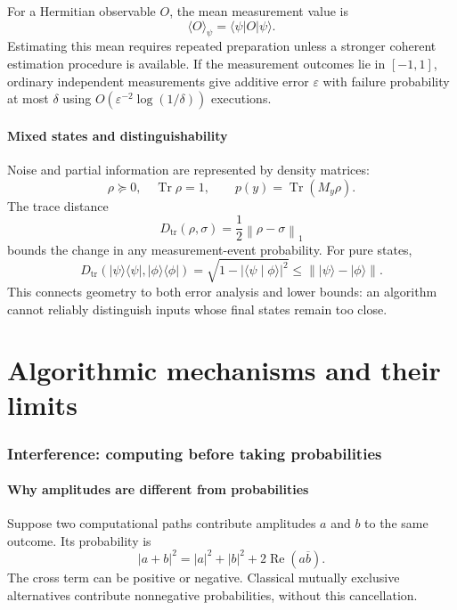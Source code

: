 \documentclass[11pt,a4paper]{article}
\newcommand{\ket}[1]{\lvert #1\rangle}
\newcommand{\bra}[1]{\langle #1\rvert}
\newcommand{\braket}[2]{\langle #1\mid #2\rangle}
\newcommand{\norm}[1]{\left\lVert #1\right\rVert}
\newcommand{\Tr}{\operatorname{Tr}}
\theoremstyle{definition}
\theoremstyle{remark}
\numberwithin{equation}{section}
\begin{document}
For a Hermitian observable $O$, the mean measurement value is
\begin{equation}
 \langle O\rangle_\psi=\bra{\psi}O\ket{\psi}.
\end{equation}
Estimating this mean requires repeated preparation unless a stronger coherent
estimation procedure is available. If the measurement outcomes lie in
$[-1,1]$, ordinary independent measurements give additive error $\varepsilon$
with failure probability at most $\delta$ using
$O(\varepsilon^{-2}\log(1/\delta))$ executions.

\subsection{Mixed states and distinguishability}
Noise and partial information are represented by density matrices:
\begin{equation}
 \rho\succeq0,\quad \Tr\rho=1,\qquad p(y)=\Tr(M_y\rho).
\end{equation}
The trace distance
\begin{equation}
 D_{\mathrm{tr}}(\rho,\sigma)=\frac12\norm{\rho-\sigma}_1
\end{equation}
bounds the change in any measurement-event probability. For pure states,
\begin{equation}\label{eq:tracedistance}
 D_{\mathrm{tr}}(\ket{\psi}\bra{\psi},\ket{\phi}\bra{\phi})
 =\sqrt{1-|\braket{\psi}{\phi}|^2}
 \leq\norm{\ket{\psi}-\ket{\phi}}.
\end{equation}
This connects geometry to both error analysis and lower bounds: an algorithm
cannot reliably distinguish inputs whose final states remain too close.



\FloatBarrier\clearpage
\part{Algorithmic mechanisms and their limits}\label{part:algorithms}
\section{Interference: computing before taking probabilities}\label{sec:interference}
\subsection{Why amplitudes are different from probabilities}
Suppose two computational paths contribute amplitudes $a$ and $b$ to the same
outcome. Its probability is
\begin{equation}\label{eq:interference}
 |a+b|^2=|a|^2+|b|^2+2\operatorname{Re}(a\overline b).
\end{equation}
The cross term can be positive or negative. Classical mutually exclusive
alternatives contribute nonnegative probabilities, without this cancellation.
\end{document}
